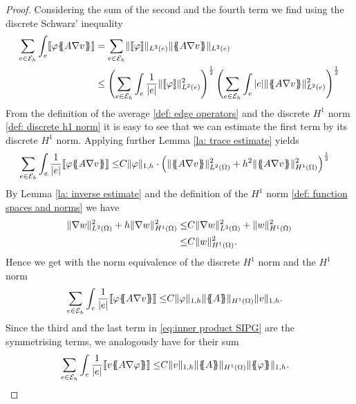 \begin{proof}
Considering the sum of the second and the fourth term we find using the discrete Schwarz' inequality
\begin{align}
	\sum\limits_{e \in \edges}\int_{e} \jump {\varphi \average{A \nabla v} } &=
	\sum\limits_{e \in \edges}  \LTwonormE{\jump {\varphi}} \LTwonormE {\average{A \nabla v}} \nonumber \\
	& \leq
		\left( \sum\limits_{e \in \edges}\int_{e} \frac 1 {|e|}\LTwonormE{\jump {\varphi}}^2 \right)^{\frac 1 2}
		\left( \sum\limits_{e \in \edges}\int_{e} |e|\LTwonormE{\average{A \nabla v}}^2 \right)^{\frac 1 2} \label{eq: CS estimate}
\end{align}
From the definition of the average \ref{def: edge operators} and the discrete $H^1$ norm \ref{def: discrete h1 norm} it is easy to see that we can estimate the first term by its discrete $H^1$ norm. Applying further Lemma \ref{la: trace estimate} yields
\begin{align*}
	\sum\limits_{e \in \edges}\int_{e} \frac 1 {|e|} \jump{\varphi \average{A \nabla v} } 
	\leq&
		C %
		\HOneDnorm{\varphi}
		\cdot \left(\LTwonorm{\average{A \nabla v}}^2 
		+ h^2 \HOnenorm{\average{A \nabla v}}^2 \right)^{\frac 1 2} 
	\end{align*}
By Lemma \ref{la: inverse estimate} and the definition of the $H^1$ norm \ref{def: function spaces and norms} we have
\begin{align}
\lVert  {\nabla w} \rVert_{L^2(\Omega)}^2 + h \lVert  { \nabla w} \rVert_{H^1(\Omega)}^2 
\leq& C \lVert  {\nabla w} \rVert_{L^2(\Omega)}^2 + \lVert  {w} \rVert_{H^1(\Omega)}^2 \nonumber\\
\leq& C \lVert  {w} \rVert_{H^1(\Omega)}^2. \label{eq: nabla estimate}
\end{align}
Hence we get with the norm equivalence of the discrete $H^1$ norm and the $H^1$ norm
\begin{align}
\sum\limits_{e \in \edges}\int_{e} \frac 1 {|e|}\jump {\varphi \average{A \nabla v} } \leq&
	C \HOneDnorm{ \varphi}\HOnenorm{\average A}\HOneDnorm{{v}}.\label{eq: estimate second fourth term}
\end{align}
Since the third and the last term in \eqref{eq:inner product SIPG} are the symmetrising terms, we analogously have for their sum
\begin{align}
\sum\limits_{e \in \edges}\int_{e} \frac 1 {|e|}\jump {v \average{A \nabla \varphi} } \leq&
C \HOneDnorm{v}\HOnenorm{\average A}\HOneDnorm{\average{\varphi}}. \label{eq: estimate third fifth term}

\end{align}
\end{proof}
